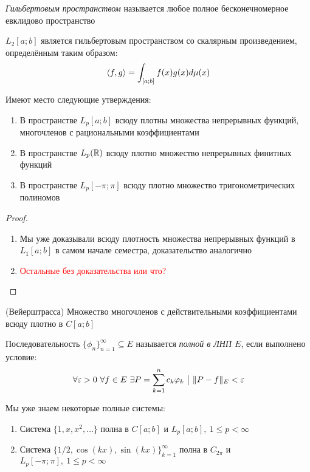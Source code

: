 \begin{definition}
	\textit{Гильбертовым пространством} называется любое полное бесконечномерное евклидово пространство
\end{definition}

\begin{corollary}
	$L_2[a; b]$ является гильбертовым пространством со скалярным произведением, определённым таким образом:
	\[
		\left\langle f, g\right\rangle = \int_{[a; b]} f(x)g(x)d\mu(x)
	\]
\end{corollary}

\begin{theorem}
	Имеют место следующие утверждения:
	\begin{enumerate}
		\item В пространстве $L_p[a; b]$ всюду плотны множества непрерывных функций, многочленов с рациональными коэффициентами
		
		\item В пространстве $L_p(\mathbb{R})$ всюду плотно множество непрерывных финитных функций
		
		\item В пространстве $L_p[-\pi; \pi]$ всюду плотно множество тригонометрических полиномов
	\end{enumerate}
\end{theorem}

\begin{proof}~
	\begin{enumerate}
		\item Мы уже доказывали всюду плотность множества непрерывных функций в $L_1[a; b]$ в самом начале семестра, доказательство аналогично
		
		\item \textcolor{red}{Остальные без доказательства или что?}
	\end{enumerate}
\end{proof}

\begin{theorem} (Вейерштрасса)
	Множество многочленов с действительными коэффициентами всюду плотно в $C[a; b]$
\end{theorem}

\begin{definition}
	Последовательность $\{\phi_n\}_{n = 1}^\infty \subseteq E$ называется \textit{полной в ЛНП $E$}, если выполнено условие:
	\[
		\forall \varepsilon > 0\ \forall f \in E\ \exists P = \sum_{k = 1}^n c_k\varphi_k \ \big|\  \|P - f\|_E < \varepsilon
	\]
\end{definition}

\begin{corollary}
	Мы уже знаем некоторые полные системы:
	\begin{enumerate}
		\item Система $\{1, x, x^2, \ldots\}$ полна в $C[a; b]$ и $L_p[a; b],\ 1 \le p < \infty$
		
		\item Система $\{1 / 2, \cos(kx), \sin(kx)\}_{k = 1}^\infty$ полна в $C_{2\pi}$ и $L_p[-\pi; \pi],\ 1 \le p < \infty$
	\end{enumerate}
\end{corollary}

